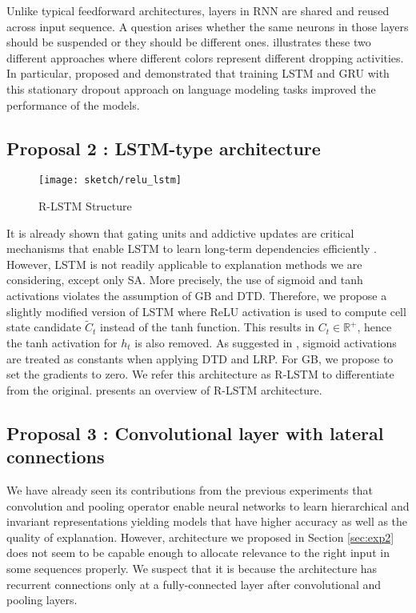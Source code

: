 Unlike typical feedforward architectures, layers in RNN are shared and reused across input sequence. A question arises whether the same neurons in those layers should be suspended or they should be different ones. \addfigure{\ref{fig:dropout_lstm}} illustrates these two different approaches where different colors represent different dropping activities. In particular, \citet{GalTheoreticallyGroundedApplication2016} proposed and demonstrated that training LSTM and GRU with this stationary dropout approach on language modeling tasks improved the performance of the models.


\subsection{Proposal 2 : LSTM-type architecture}
\begin{figure}[!htb]
\centering
\texttt{[image: sketch/relu\_lstm]}
\caption{R-LSTM Structure} 

\label{fig:relu_lstm} 
\end{figure}

It is already shown that gating units and addictive updates are critical mechanisms that enable LSTM to learn long-term dependencies efficiently \citep{GreffLSTMsearchspace2017, JozefowiczEmpiricalExplorationRecurrent2015}. However, LSTM is not readily applicable to explanation methods we are considering, except only SA. More precisely, the use of sigmoid and tanh activations violates the assumption of GB and DTD. Therefore, we propose a slightly modified version of LSTM where ReLU activation is used to compute cell state candidate $\widetilde{C}_t$ instead of the tanh function. This results in $C_t \in \mathbb{R}^+$, hence the tanh activation for $h_t$  is also removed.  As suggested in \citep{ArrasExplainingRecurrentNeural2017},  sigmoid activations are treated as constants when applying DTD and LRP. For GB, we propose to set the gradients to zero. We refer this architecture as R-LSTM to differentiate from the original.  \addfigure{\ref{fig:relu_lstm}} presents an overview of R-LSTM architecture.


\subsection{Proposal 3 : Convolutional layer with lateral connections}
We have already seen its contributions from the previous experiments that convolution and pooling operator enable neural networks to learn hierarchical and invariant representations yielding models that have higher accuracy as well as the quality of explanation. However,  architecture we proposed in Section \ref{sec:exp2} does not seem to be capable enough to allocate relevance to the right input in some sequences properly. We suspect that it is because the architecture has recurrent connections only at a fully-connected layer after convolutional and pooling layers. 


